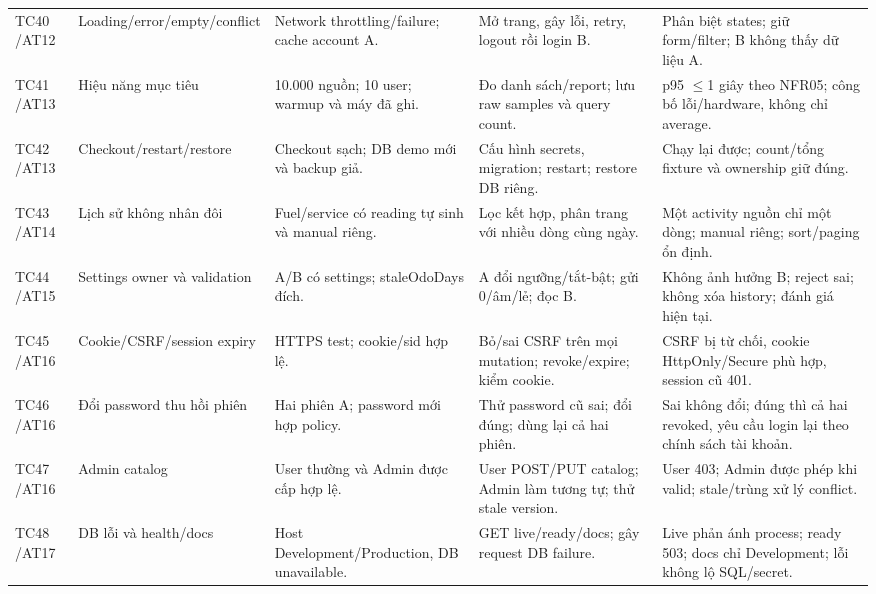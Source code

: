 \begin{smalltable}
\begin{longtable}{L{1.2cm}L{2.5cm}L{3.6cm}L{3.6cm}L{3.7cm}}
TC40 /\allowbreak  AT12 & Loading/\allowbreak error/\allowbreak empty/\allowbreak conflict & Network throttling/\allowbreak failure; cache account A. & Mở trang,  gây lỗi,  retry,  logout rồi login B. & Phân biệt states; giữ form/\allowbreak filter; B không thấy dữ liệu A.\\
TC41 /\allowbreak  AT13 & Hiệu năng mục tiêu & 10.000 nguồn; 10 user; warmup và máy đã ghi. & Đo danh sách/\allowbreak report; lưu raw samples và query count. & p95 $\le$1 giây theo NFR05; công bố lỗi/\allowbreak hardware,  không chỉ average.\\
TC42 /\allowbreak  AT13 & Checkout/\allowbreak restart/\allowbreak restore & Checkout sạch; DB demo mới và backup giả. & Cấu hình secrets,  migration; restart; restore DB riêng. & Chạy lại được; count/\allowbreak tổng fixture và ownership giữ đúng.\\
TC43 /\allowbreak  AT14 & Lịch sử không nhân đôi & Fuel/\allowbreak service có reading tự sinh và manual riêng. & Lọc kết hợp,  phân trang với nhiều dòng cùng ngày. & Một activity nguồn chỉ một dòng; manual riêng; sort/\allowbreak paging ổn định.\\
TC44 /\allowbreak  AT15 & Settings owner và validation & A/\allowbreak B có settings; staleOdoDays đích. & A đổi ngưỡng/\allowbreak tắt-bật; gửi 0/\allowbreak âm/\allowbreak lẻ; đọc B. & Không ảnh hưởng B; reject sai; không xóa history; đánh giá hiện tại.\\
TC45 /\allowbreak  AT16 & Cookie/\allowbreak CSRF/\allowbreak session expiry & HTTPS test; cookie/\allowbreak sid hợp lệ. & Bỏ/\allowbreak sai CSRF trên mọi mutation; revoke/\allowbreak expire; kiểm cookie. & CSRF bị từ chối,  cookie HttpOnly/\allowbreak Secure phù hợp,  session cũ 401.\\
TC46 /\allowbreak  AT16 & Đổi password thu hồi phiên & Hai phiên A; password mới hợp policy. & Thử password cũ sai; đổi đúng; dùng lại cả hai phiên. & Sai không đổi; đúng thì cả hai revoked,  yêu cầu login lại theo chính sách tài khoản.\\
TC47 /\allowbreak  AT16 & Admin catalog & User thường và Admin được cấp hợp lệ. & User POST/\allowbreak PUT catalog; Admin làm tương tự; thử stale version. & User 403; Admin được phép khi valid; stale/\allowbreak trùng xử lý conflict.\\
TC48 /\allowbreak  AT17 & DB lỗi và health/\allowbreak docs & Host Development/\allowbreak Production,  DB unavailable. & GET live/\allowbreak ready/\allowbreak docs; gây request DB failure. & Live phản ánh process; ready 503; docs chỉ Development; lỗi không lộ SQL/\allowbreak secret.\\

\end{longtable}
\end{smalltable}
